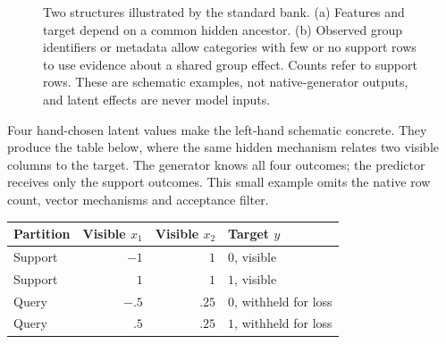 \documentclass[11pt]{article}
\begin{document}
\begin{figure}[htbp]
\begin{tikzpicture}
\end{tikzpicture}
\caption{Two structures illustrated by the standard bank. (a) Features and target depend on a common hidden ancestor. (b) Observed group identifiers or metadata allow categories with few or no support rows to use evidence about a shared group effect. Counts refer to support rows. These are schematic examples, not native-generator outputs, and latent effects are never model inputs.}
\label{fig:prior-mechanisms}
\end{figure}

Four hand-chosen latent values make the left-hand schematic concrete. They produce the table below, where the same hidden mechanism relates two visible columns to the target. The generator knows all four outcomes; the predictor receives only the support outcomes. This small example omits the native row count, vector mechanisms and acceptance filter.
\begin{center}\small
\begin{tabular}{@{}lrrl@{}}
\toprule Partition & Visible $x_1$ & Visible $x_2$ & Target $y$\\
\midrule
Support & $-1$ & $1$ & $0$, visible\\
Support & $1$ & $1$ & $1$, visible\\
Query & $-.5$ & $.25$ & $0$, withheld for loss\\
Query & $.5$ & $.25$ & $1$, withheld for loss\\
\bottomrule
\end{tabular}
\end{center}
\end{document}
